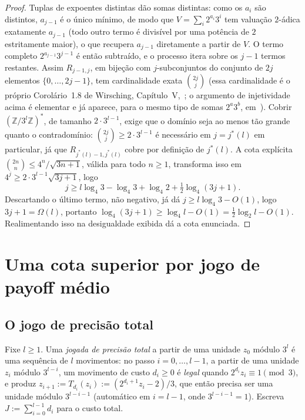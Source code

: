 \documentclass[11pt]{amsart}
\theoremstyle{plain}
\theoremstyle{definition}
\theoremstyle{remark}
\newcommand{\Z}{\mathbb{Z}}
\begin{document}
\begin{proof}
Tuplas de expoentes distintas dão somas distintas: como os $a_i$ são distintos, $a_{j-1}$ é o único
mínimo, de modo que $V=\sum_i 2^{a_i}3^i$ tem valuação $2$-ádica exatamente $a_{j-1}$ (todo outro
termo é divisível por uma potência de $2$ estritamente maior), o que recupera $a_{j-1}$ diretamente
a partir de $V$. O termo completo $2^{a_{j-1}}3^{j-1}$ é então subtraído, e o processo itera sobre
os $j-1$ termos restantes. Assim $R_{j-1,j}$, em bijeção com $j$-subconjuntos do conjunto de $2j$
elementos $\{0,\dots,2j-1\}$, tem cardinalidade exata $\binom{2j}{j}$ (essa cardinalidade é o
próprio Corolário~1.8 de Wirsching, Capítulo~V,~\cite{wirsching1998}; o argumento de injetividade
acima é elementar e já aparece, para o mesmo tipo de somas $2^a3^b$, em~\cite{tao2011blog}).
Cobrir $(\Z/3^l\Z)^*$, de tamanho $2\cdot3^{l-1}$, exige que o domínio seja ao menos tão grande
quanto o contradomínio: $\binom{2j}{j} \ge 2\cdot3^{l-1}$ é necessário em $j=j^*(l)$ em particular,
já que $R_{j^*(l)-1,j^*(l)}$ cobre por definição de $j^*(l)$. A cota explícita
$\binom{2n}{n} \le 4^n/\sqrt{3n+1}$, válida para todo $n\ge1$, transforma isso em
$4^j \ge 2\cdot3^{l-1}\sqrt{3j+1}$, logo
\[
j \ge l\log_4 3 - \log_4 3 + \log_4 2 + \tfrac12\log_4(3j+1).
\]
Descartando o último termo, não negativo, já dá $j \ge l\log_4 3 - O(1)$, logo
$3j+1 = \Omega(l)$, portanto $\log_4(3j+1) \ge \log_4 l - O(1) = \tfrac12\log_2 l - O(1)$.
Realimentando isso na desigualdade exibida dá a cota enunciada.
\end{proof}

\section{Uma cota superior por jogo de payoff médio}
\label{sec:mpg}

\subsection*{O jogo de precisão total}

Fixe $l\ge1$. Uma \emph{jogada de precisão total} a partir de uma unidade $z_0$ módulo $3^l$ é uma
sequência de $l$ movimentos: no passo $i=0,\dots,l-1$, a partir de uma unidade $z_i$ módulo
$3^{l-i}$, um movimento de custo $d_i\ge0$ é \emph{legal} quando $2^{d_i}z_i\equiv1\pmod3$, e
produz $z_{i+1}:=T_{d_i}(z_i):=(2^{d_i+1}z_i-2)/3$, que então precisa ser uma unidade módulo
$3^{l-i-1}$ (automático em $i=l-1$, onde $3^{l-i-1}=1$). Escreva $J:=\sum_{i=0}^{l-1}d_i$ para o
custo total.
\end{document}
